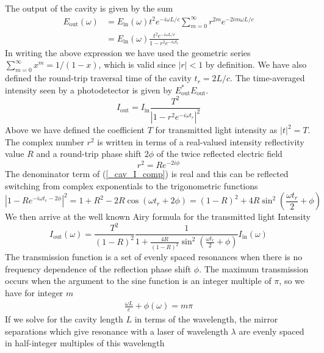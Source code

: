 The output of the cavity is given by the sum
\begin{align} \label{cav_E-sum}
	E_\mathrm{out}(\omega) &= E_\mathrm{in}(\omega) t^2 e^{-i\omega L/c} \sum_{m=0}^\infty r^{2m} e^{-2im\omega L/c} \nonumber \\
	&=E_\mathrm{in}(\omega)\frac{t^2 e^{-i\omega L/c}}{1-r^2 e^{-i\omega t_r}}
\end{align}
In writing the above expression we have used the geometric series $\sum_{m=0}^\infty x^m = 1/(1-x)$, which is valid since $\left|r\right| < 1$ by definition. We have also defined the round-trip traversal time of the cavity $t_r = 2L/c$. The time-averaged intensity seen by a photodetector is given by $E_\mathrm{out}^* E_\mathrm{out}$.
\begin{equation} \label{_cav_I_comp}
	I_\mathrm{out} = I_\mathrm{in} \frac{T^2}{\left|1 - r^2 e^{-i\omega t_r}\right|^2}
\end{equation}
Above we have defined the coefficient $T$ for transmitted light intensity as $\left|t\right|^2 = T$. The complex number $r^2$ is written in terms of a real-valued intensity reflectivity value $R$ and a round-trip phase shift $2\phi$ of the twice reflected electric field
\begin{equation} \label{cav_R_defin}
	r^2 = Re^{-2i\phi}
\end{equation}
The denominator term of (\ref{_cav_I_comp}) is real and this can be reflected switching from complex exponentials to the trigonometric functions
\begin{equation}
	\left|1 - R e^{-i\omega t_r - 2\phi}\right|^2 = 1 + R^2 - 2R\cos(\omega t_r + 2\phi) = (1-R)^2 + 4R\sin^2(\frac{\omega t_r}{2} + \phi)
\end{equation}
We then arrive at the well known Airy formula for the transmitted light Intensity
\begin{equation}\label{cav_airy}
	I_\mathrm{out}(\omega) = \frac{T^2}{(1-R)^2}\frac{1}{1 + \frac{4R}{(1-R)^2}\sin^2\left(\frac{\omega t_r}{2} + \phi\right)} I_\mathrm{in}(\omega)
\end{equation}
The transmission function is a set of evenly spaced resonances when there is no frequency dependence of the reflection phase shift $\phi$. The maximum transmission occurs when the argument to the sine function is an integer multiple of $\pi$, so we have for integer $m$
\begin{align} \label{cav_resonance_condition}
	\frac{\omega L}{c} + \phi(\omega) = m \pi
\end{align}
If we solve for the cavity length $L$ in terms of the wavelength, the mirror separations which give resonance with a laser of wavelength $\lambda$ are evenly spaced in half-integer multiples of this wavelength
